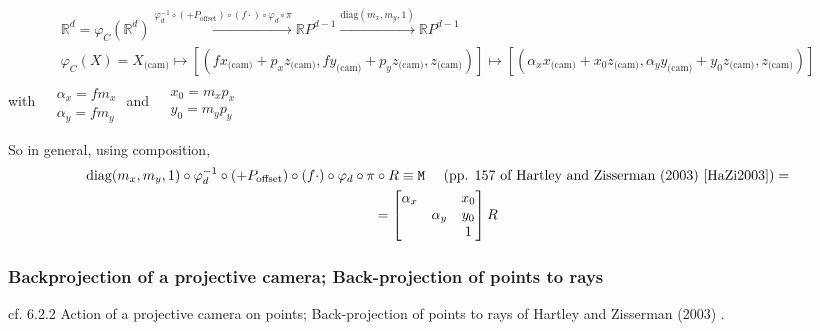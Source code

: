 \documentclass[10pt]{amsart}
\begin{document}
\begin{multicols*}{2}
\[
\begin{gathered}
 \mathbb{R}^d = \varphi_C(\mathbb{R}^d) \xrightarrow{  \varphi_d^{-1} \circ (+P_{\text{offset}} )\circ (f\cdot) \circ \varphi_d \circ \pi } \mathbb{R}P^{d-1} \xrightarrow{ \text{diag}(m_x,m_y,1) } \mathbb{R}P^{d-1} \\ 
\varphi_C(X) = X_{\text{(cam)}} \mapsto [(fx_{\text{(cam)}} + p_x z_{\text{(cam)}} , fy_{\text{(cam)}} + p_y z_{\text{(cam)}} , z_{\text{(cam)}} ) ] \mapsto [ (\alpha_x x_{\text{(cam)}} + x_0 z_{\text{(cam)}} , \alpha_y y_{\text{(cam)}} + y_0 z_{\text{(cam)}}, z_{\text{(cam)}} )]
\end{gathered}
\]
with $\begin{aligned} & \quad \\
	& \alpha_x = fm_x \\ 
& \alpha_y = fm_y \end{aligned}$ and $\begin{aligned} & \quad \\
	& x_0 = m_x p_x \\ 
& y_0 = m_y p_y \end{aligned}$

So in general, using composition, 
\begin{equation}
\begin{gathered}
\text{diag}(m_x , m_y , 1) \circ \varphi_d^{-1} \circ ( + P_{\text{offset}} ) \circ (f\cdot)\circ \varphi_d \circ \pi \circ R \equiv \texttt{M} \quad \text{ (pp. 157 of Hartley and Zisserman (2003) \cite{HaZi2003})} = \\
	= \left[ \begin{matrix} \alpha_x & & x_0 \\ & \alpha_y & y_0 \\ & & 1 \end{matrix} \right] R 
\end{gathered}
\end{equation}

\subsubsection{Backprojection of a projective camera; Back-projection of points to rays}  

cf. 6.2.2 Action of a projective camera on points; Back-projection of points to rays of Hartley and Zisserman (2003) \cite{HaZi2003}.  


\end{multicols*}
\end{document}
